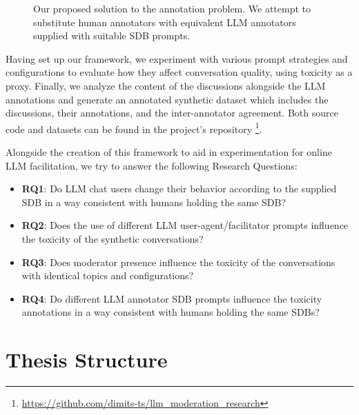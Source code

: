 \begin{figure}
	\centering
	
	\caption{Our proposed solution to the annotation problem. We attempt to substitute human annotators with equivalent LLM annotators supplied with suitable \ac{SDB} prompts.}
	\label{fig::goals_4}
\end{figure}


Having set up our framework, we experiment with various prompt strategies and configurations to evaluate how they affect conversation quality, using toxicity as a proxy. Finally, we analyze the content of the discussions alongside the LLM annotations and generate an annotated synthetic dataset which includes the discussions, their annotations, and the inter-annotator agreement. Both source code and datasets can be found in the project's repository \footnote{\url{https://github.com/dimits-ts/llm_moderation_research}}.

Alongside the creation of this framework to aid in experimentation for online LLM facilitation, we try to answer the following Research Questions:

\begin{itemize}
	\item \textbf{RQ1}: Do LLM chat users change their behavior according to the supplied \ac{SDB} in a way consistent with humans holding the same \ac{SDB}?
	
	\item \textbf{RQ2}: Does the use of different LLM user-agent/facilitator prompts influence the toxicity of the synthetic conversations?
	
	\item \textbf{RQ3}: Does moderator presence influence the toxicity of the conversations with identical topics and configurations?
	
	\item \textbf{RQ4}: Do different LLM annotator \ac{SDB} prompts influence the toxicity annotations in a way consistent with humans holding the same \acp{SDB}?
\end{itemize}



\section{Thesis Structure}
\label{sec:intro:structure}

